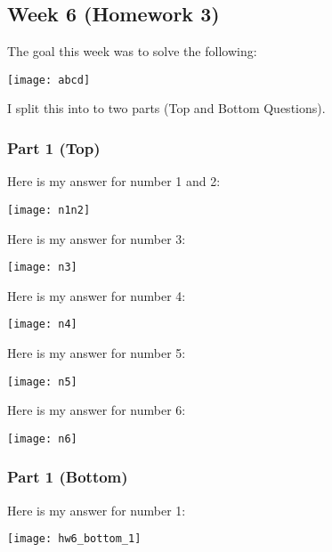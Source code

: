 \documentclass{article}
\theoremstyle{theorem}
\theoremstyle{definition}
\theoremstyle{remark}
\begin{document}
\subsection{Week 6 (Homework 3)}
\noindent\newline The goal this week was to solve the following:

\texttt{[image: abcd]}\noindent\newline

\noindent\newline I split this into to two parts (Top and Bottom Questions).

\subsubsection{Part 1 (Top)}
\noindent\newline Here is my answer for number 1 and 2:

\texttt{[image: n1n2]}\noindent\newline

\noindent\newline Here is my answer for number 3:

\texttt{[image: n3]}\noindent\newline

\noindent\newline Here is my answer for number 4:

\texttt{[image: n4]}\noindent\newline

\noindent\newline Here is my answer for number 5:

\texttt{[image: n5]}\noindent\newline

\noindent\newline Here is my answer for number 6:

\texttt{[image: n6]}\noindent\newline

\subsubsection{Part 1 (Bottom)}
\noindent\newline Here is my answer for number 1:

\texttt{[image: hw6\_bottom\_1]}\noindent\newline
\end{document}
